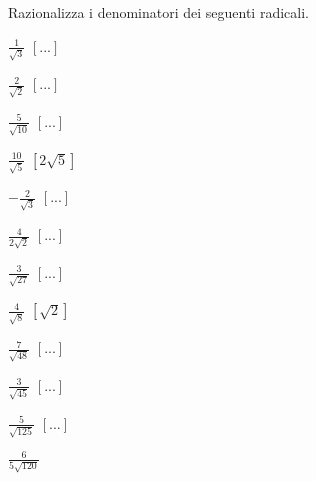 
\subsubsection*{}

\begin{esercizio}[*]
\label{ese:2.68}
Razionalizza i denominatori dei seguenti radicali.
\begin{htmulticols}{4}
\begin{enumeratea}
\item \(\frac 1{\sqrt 3}\)
\hfill \(\left[...\right]\)
\item \(\frac 2{\sqrt 2}\)
\hfill \(\left[...\right]\)
\item \(\frac 5{\sqrt{10}}\)
\hfill \(\left[...\right]\)
\item \(\frac{10}{\sqrt 5}\)
\hfill \(\left[2\sqrt 5\right]\)
\item \(-\frac 2{\sqrt 3}\)
\hfill \(\left[...\right]\)
\item \(\frac 4{2\sqrt 2}\)
\hfill \(\left[...\right]\)
\item \(\frac 3{\sqrt{27}}\)
\hfill \(\left[...\right]\)
\item \(\frac 4{\sqrt 8}\)
\hfill \(\left[\sqrt 2\right]\)
\item \(\frac 7{\sqrt{48}}\)
\hfill \(\left[...\right]\)
\item \(\frac 3{\sqrt{45}}\)
\hfill \(\left[...\right]\)
\item \(\frac 5{\sqrt{125}}\)
\hfill \(\left[...\right]\)
\item \(\frac 6{5\sqrt{120}}\)

\end{enumeratea}
\end{htmulticols}
\end{esercizio}
